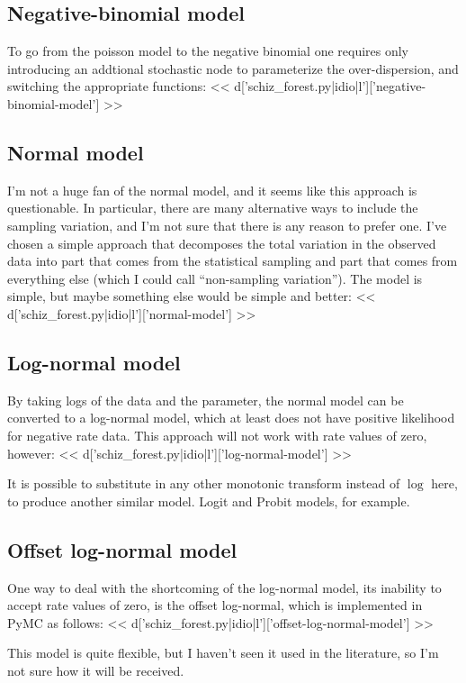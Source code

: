 \subsection{Negative-binomial model}
To go from the poisson model to the negative binomial one requires
only introducing an addtional stochastic node to parameterize the
over-dispersion, and switching the appropriate functions:
<< d['schiz_forest.py|idio|l']['negative-binomial-model'] >>

\subsection{Normal model}
I'm not a huge fan of the normal model, and it seems like this
approach is questionable.  In particular, there are many alternative
ways to include the sampling variation, and I'm not sure that there is
any reason to prefer one.  I've chosen a simple approach that
decomposes the total variation in the observed data into part that
comes from the statistical sampling and part that comes from
everything else (which I could call ``non-sampling variation'').  The
model is simple, but maybe something else would be simple and better:
<< d['schiz_forest.py|idio|l']['normal-model'] >>



\subsection{Log-normal model}
By taking logs of the data and the parameter, the normal model can be
converted to a log-normal model, which at least does not have positive
likelihood for negative rate data.  This approach will not work with
rate values of zero, however:
<< d['schiz_forest.py|idio|l']['log-normal-model'] >>

It is possible to substitute in any other monotonic transform instead
of $\log$ here, to produce another similar model.  Logit and Probit
models, for example.



\subsection{Offset log-normal model}
One way to deal with the shortcoming of the log-normal model, its
inability to accept rate values of zero, is the offset log-normal,
which is implemented in PyMC as follows:
<< d['schiz_forest.py|idio|l']['offset-log-normal-model'] >>

This model is quite flexible, but I haven't seen it used in the
literature, so I'm not sure how it will be received.

